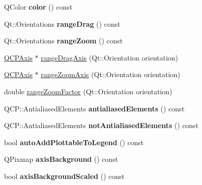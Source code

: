 \begin{DoxyCompactItemize}
\item 
\hypertarget{classQCustomPlot_a42220030a6a0bd382051335a42bcd151}{Q\-Color {\bfseries color} () const }\label{classQCustomPlot_a42220030a6a0bd382051335a42bcd151}

\item 
\hypertarget{classQCustomPlot_adfcd517ffa1e74783fbe01b27b333de0}{Qt\-::\-Orientations {\bfseries range\-Drag} () const }\label{classQCustomPlot_adfcd517ffa1e74783fbe01b27b333de0}

\item 
\hypertarget{classQCustomPlot_a40dd09c92846490766c5b6ddffe18db4}{Qt\-::\-Orientations {\bfseries range\-Zoom} () const }\label{classQCustomPlot_a40dd09c92846490766c5b6ddffe18db4}

\item 
\hyperlink{classQCPAxis}{Q\-C\-P\-Axis} $\ast$ \hyperlink{classQCustomPlot_a0e0923c32c4b71509afc26062d3e625d}{range\-Drag\-Axis} (Qt\-::\-Orientation orientation)
\item 
\hyperlink{classQCPAxis}{Q\-C\-P\-Axis} $\ast$ \hyperlink{classQCustomPlot_a81c0f9cdb32b2afc1fc07440c9f3fa7b}{range\-Zoom\-Axis} (Qt\-::\-Orientation orientation)
\item 
double \hyperlink{classQCustomPlot_ad833d4bd16c7b27621abd373db72d33a}{range\-Zoom\-Factor} (Qt\-::\-Orientation orientation)
\item 
\hypertarget{classQCustomPlot_a81e954fbb485bb44c609e5707f0067b3}{Q\-C\-P\-::\-Antialiased\-Elements {\bfseries antialiased\-Elements} () const }\label{classQCustomPlot_a81e954fbb485bb44c609e5707f0067b3}

\item 
\hypertarget{classQCustomPlot_a8060cee59757213764382a78d3196189}{Q\-C\-P\-::\-Antialiased\-Elements {\bfseries not\-Antialiased\-Elements} () const }\label{classQCustomPlot_a8060cee59757213764382a78d3196189}

\item 
\hypertarget{classQCustomPlot_ad1599fc3fd1833b5988f6b89c1f616ca}{bool {\bfseries auto\-Add\-Plottable\-To\-Legend} () const }\label{classQCustomPlot_ad1599fc3fd1833b5988f6b89c1f616ca}

\item 
\hypertarget{classQCustomPlot_a6aeb0631c4767e8a1d758b9c06a9ea8f}{Q\-Pixmap {\bfseries axis\-Background} () const }\label{classQCustomPlot_a6aeb0631c4767e8a1d758b9c06a9ea8f}

\item 
\hypertarget{classQCustomPlot_a7a61753e3525e12e55165728a877b701}{bool {\bfseries axis\-Background\-Scaled} () const }\label{classQCustomPlot_a7a61753e3525e12e55165728a877b701}


\end{DoxyCompactItemize}
